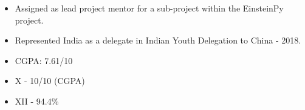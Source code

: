 
\smallskip
{}
\begin{itemize}
\item Assigned as lead project mentor for a sub-project within the EinsteinPy project.
\end{itemize}

\smallskip
{}
\begin{itemize}
\item Represented India as a delegate in Indian Youth Delegation to China - 2018.
\end{itemize}



\begin{itemize}
    \item CGPA: 7.61/10
\end{itemize}

\divider

\begin{itemize}
    \item X - 10/10 (CGPA)
    \item XII - 94.4\%
\end{itemize}


\smallskip







